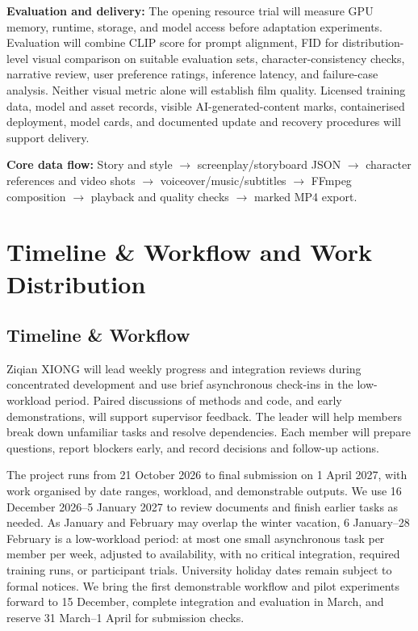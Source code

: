 \documentclass[a4paper,12pt]{article}
\begin{document}
\noindent\textbf{Evaluation and delivery:}
The opening resource trial will measure GPU memory, runtime, storage, and model access before adaptation experiments. Evaluation will combine CLIP score for prompt alignment, FID for distribution-level visual comparison on suitable evaluation sets, character-consistency checks, narrative review, user preference ratings, inference latency, and failure-case analysis. Neither visual metric alone will establish film quality. Licensed training data, model and asset records, visible AI-generated-content marks, containerised deployment, model cards, and documented update and recovery procedures will support delivery.

\medskip
\noindent\textbf{Core data flow:}
Story and style $\rightarrow$ screenplay/storyboard JSON $\rightarrow$ character references and video shots $\rightarrow$ voiceover/music/subtitles $\rightarrow$ FFmpeg composition $\rightarrow$ playback and quality checks $\rightarrow$ marked MP4 export.

\newpage
\section{Timeline \& Workflow and Work Distribution}
\subsection{Timeline \& Workflow}
Ziqian XIONG will lead weekly progress and integration reviews during concentrated development and use brief asynchronous check-ins in the low-workload period. Paired discussions of methods and code, and early demonstrations, will support supervisor feedback. The leader will help members break down unfamiliar tasks and resolve dependencies. Each member will prepare questions, report blockers early, and record decisions and follow-up actions.

The project runs from 21 October 2026 to final submission on 1 April 2027, with work organised by date ranges, workload, and demonstrable outputs. We use 16 December 2026--5 January 2027 to review documents and finish earlier tasks as needed. As January and February may overlap the winter vacation, 6 January--28 February is a low-workload period: at most one small asynchronous task per member per week, adjusted to availability, with no critical integration, required training runs, or participant trials. University holiday dates remain subject to formal notices. We bring the first demonstrable workflow and pilot experiments forward to 15 December, complete integration and evaluation in March, and reserve 31 March--1 April for submission checks.
\end{document}
